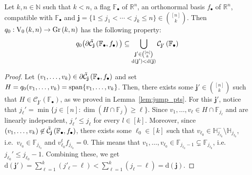 \begin{lemma}\label{lem:q0_on_bdr} Let $k,n\in\mathbb{N}$ such that $k<n$, a flag $\mathbb{F}_{\bullet}$ of $\mathbb{R}^n$, an orthonormal basis $f_{\bullet}$ of $\mathbb{R}^n$, compatible with $\mathbb{F}_{\bullet}$ and $\mathbf{j}=\{1\leq j_1<\cdots<j_k\leq n\}\in\binom{[n]}{k}$. Then $q_0:\StO{k}{n}\to\Gr{k}{n}$ has the following property:
\[q_0\big(\partial\tilde{\mathcal{C}}_{\mathbf{j}}\left(\mathbb{F}_{\bullet},f_{\bullet}\right)\big)\subseteq\bigcup_{\substack{\mathbf{j}'\in\binom{[n]}{k}\\\mathrm{d}(\mathbf{j}')<\mathrm{d}(\mathbf{j})}}\mathcal{C}_{\mathbf{j'}}\left(\mathbb{F}_{\bullet}\right)\]
\end{lemma}
\begin{proof} Let $(v_1,\ldots,v_k)\in\partial\tilde{\mathcal{C}}_{\mathbf{j}}\left(\mathbb{F}_{\bullet},f_{\bullet}\right)$ and set $H=q_0(v_1,\ldots,v_k)=\mathrm{span}\{v_1,\ldots,v_k\}$. Then, there exists some $\mathbf{j}'\in\binom{[n]}{k}$ such that $H\in\mathcal{C}_{\mathbf{j}'}(\mathbb{F}_{\bullet})$, as we proved in Lemma~\ref{lem:jump_pts}. For this $\mathbf{j}'$, notice that $j_{\ell}'=\min\{j\in[n]:\dim(H\cap\mathbb{F}_j)\geq\ell\}$. Since $v_1,\ldots,v_{\ell}\in H\cap\mathbb{F}_{j_{\ell}}$ and are linearly independent, $j_{\ell}'\leq j_{\ell}$ for every $l\in[k]$. Moreover, since $(v_1,\ldots,v_k)\not\in\tilde{\mathcal{C}}_{\mathbf{j}}\left(\mathbb{F}_{\bullet},f_{\bullet}\right)$, there exists some $\ell_0\in[k]$ such that $v_{\ell_0}\in\mathbb{H}_{j_{\ell_0}}^-\setminus\mathbb{H}_{j_{\ell_0}}$, i.e.\ $v_{\ell_0}\in\mathbb{F}_{j_{\ell_0}}$ and $v_{\ell_0}^tf_{j_{\ell_0}}=0$. This means that $v_1,\ldots,v_{\ell_0}\in\mathbb{F}_{j_{\ell_0}-1}\subsetneq\mathbb{F}_{j_{\ell_0}}$, i.e.\ $j_{\ell_0}'\leq j_{\ell_0}-1$. Combining these, we get $\mathrm{d}(\mathbf{j}')=\sum_{\ell=1}^k(j'_{\ell}-\ell)<\sum_{\ell=1}^k(j_{\ell}-\ell)=\mathrm{d}(\mathbf{j})$.
\end{proof}

